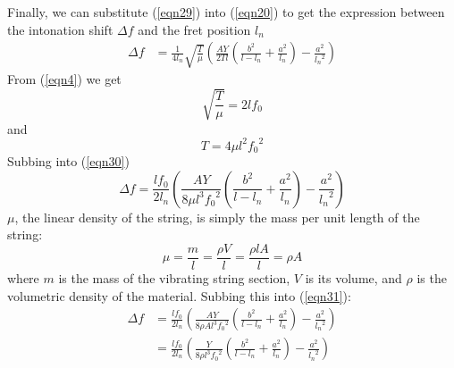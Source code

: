 Finally, we can substitute (\ref{eqn29}) into (\ref{eqn20}) to get the expression between the intonation shift $\Delta f$ and the fret position $l_n$
\begin{align}
    \Delta f &= \frac{1}{4l_n} \sqrt{\frac{T}{\mu}} \left( \frac{AY}{2Tl} \left( \frac{b^2}{l-l_n} + \frac{a^2}{l_n} \right) - \frac{a^2}{{l_n}^2} \right) \label{eqn30}
\end{align}
From (\ref{eqn4}) we get
\begin{equation*}
    \sqrt{\frac{T}{\mu}} = 2lf_0
\end{equation*}
and 
\begin{equation*}
    T = 4\mu l^2{f_0}^2    
\end{equation*}
Subbing into (\ref{eqn30})
\begin{equation}
    \Delta f = \frac{l f_0}{2l_n} \left( \frac{AY}{8\mu l^3 {f_0}^2} \left( \frac{b^2}{l-l_n} + \frac{a^2}{l_n} \right) - \frac{a^2}{{l_n}^2} \right) \label{eqn31}
\end{equation}
$\mu$, the linear density of the string, is simply the mass per unit length of the string:
\begin{equation*}
    \mu = \frac{m}{l} = \frac{\rho V}{l} = \frac{\rho l A}{l} = \rho A
\end{equation*}
where $m$ is the mass of the vibrating string section, $V$ is its volume, and $\rho$ is the volumetric density of the material. Subbing this into (\ref{eqn31}):
\begin{align}
    \Delta f &= \frac{l f_0}{2l_n} \left( \frac{AY}{8\rho A l^3 {f_0}^2} \left( \frac{b^2}{l-l_n} + \frac{a^2}{l_n} \right) - \frac{a^2}{{l_n}^2} \right) \label{eqn32} \\
    &= \frac{l f_0}{2l_n} \left( \frac{Y}{8\rho l^3 {f_0}^2} \left( \frac{b^2}{l-l_n} + \frac{a^2}{l_n} \right) - \frac{a^2}{{l_n}^2} \right) \label{eqn33}
\end{align}